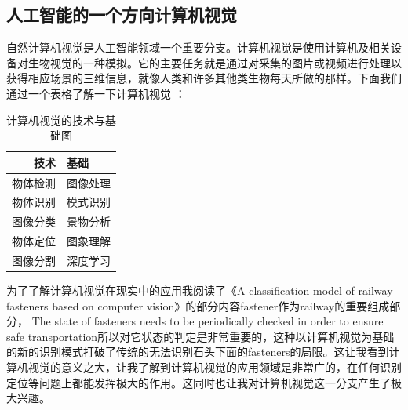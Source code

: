 \documentclass{article}
\begin{document}
\subsection{人工智能的一个方向计算机视觉}
自然计算机视觉是人工智能领域一个重要分支。计算机视觉是使用计算机及相关设备对生物视觉的一种模拟。它的主要任务就是通过对采集的图片或视频进行处理以获得相应场景的三维信息，就像人类和许多其他类生物每天所做的那样。下面我们通过一个表格了解一下计算机视觉
：\par

\begin{table}[h]
	\centering
	\caption{计算机视觉的技术与基础图}
	\begin{tabular}{r|l}
		\hline
		技术 & 基础 \\
		\hline
		物体检测 & 图像处理 \\ 
		\hline
		物体识别 & 模式识别 \\
		\hline
		图像分类 & 景物分析\\
		\hline
		物体定位 & 图象理解\\
		\hline
		图像分割 & 深度学习\\
		\hline
	\end{tabular}
	\label{table1}
\end{table}
为了了解计算机视觉在现实中的应用我阅读了《A classification model of railway fasteners based on computer vision》\citep{YangA}的部分内容fastener作为railway的重要组成部分， The state of fasteners needs to be periodically checked in order to ensure safe transportation所以对它状态的判定是非常重要的，这种以计算机视觉为基础的新的识别模式打破了传统的无法识别石头下面的fasteners的局限。这让我看到计算机视觉的意义之大，让我了解到计算机视觉的应用领域是非常广的，在任何识别定位等问题上都能发挥极大的作用。这同时也让我对计算机视觉这一分支产生了极大兴趣。\par
\end{document}
